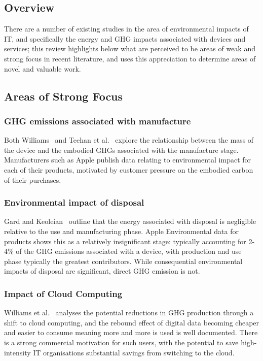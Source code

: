 \documentclass[conference]{IEEEtran}
\begin{document}
\subsection{Overview}

There are a number of existing studies in the area of environmental
impacts of IT, and specifically the energy and GHG impacts associated
with devices and services; this review highlights below what are
perceived to be areas of weak and strong focus in recent literature,
and uses this appreciation to determine areas of novel and valuable
work.

\subsection{Areas of Strong Focus}

\subsubsection{GHG emissions associated with manufacture}

Both Williams~\cite{williams:2004} and Teehan et
al.~\cite{teehan-et-al:2010} explore the relationship between the mass
of the device and the embodied GHGs associated with the manufacture
stage. Manufacturers such as Apple publish data relating to
environmental impact for each of their products, motivated by customer
pressure on the embodied carbon of their purchases.

\subsubsection{Environmental impact of disposal}

Gard and Keoleian~\cite{gard+keoleian:2002} outline that the energy
associated with disposal is negligible relative to the use and
manufacturing phase. Apple Environmental data for products shows this
as a relatively insignificant stage: typically accounting for 2-4\% of
the GHG emissions associated with a device, with production and use
phase typically the greatest contributors. While consequential
environmental impacts of disposal are significant, direct GHG emission
is not.

\subsubsection{Impact of Cloud Computing}

Williams et al.~\cite{williams-et-al:2014} analyses the potential
reductions in GHG production through a shift to cloud computing, and
the rebound effect of digital data becoming cheaper and easier to
consume meaning more and more is used is well documented. There is a
strong commercial motivation for such users, with the potential to
save high-intensity IT organisations substantial savings from
switching to the cloud.
\end{document}
